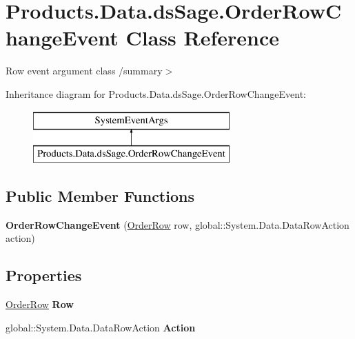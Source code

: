 \hypertarget{class_products_1_1_data_1_1ds_sage_1_1_order_row_change_event}{}\section{Products.\+Data.\+ds\+Sage.\+Order\+Row\+Change\+Event Class Reference}
\label{class_products_1_1_data_1_1ds_sage_1_1_order_row_change_event}


Row event argument class /summary$>$  


Inheritance diagram for Products.\+Data.\+ds\+Sage.\+Order\+Row\+Change\+Event\+:\begin{figure}[H]
\begin{center}
\leavevmode
\includegraphics[height=2.000000cm]{class_products_1_1_data_1_1ds_sage_1_1_order_row_change_event}
\end{center}
\end{figure}
\subsection*{Public Member Functions}
\begin{DoxyCompactItemize}
\item 
{\bfseries Order\+Row\+Change\+Event} (\hyperlink{class_products_1_1_data_1_1ds_sage_1_1_order_row}{Order\+Row} row, global\+::\+System.\+Data.\+Data\+Row\+Action action)\hypertarget{class_products_1_1_data_1_1ds_sage_1_1_order_row_change_event_a5dd450f5cfc2798dd2b8ca51857d6c02}{}\label{class_products_1_1_data_1_1ds_sage_1_1_order_row_change_event_a5dd450f5cfc2798dd2b8ca51857d6c02}

\end{DoxyCompactItemize}
\subsection*{Properties}
\begin{DoxyCompactItemize}
\item 
\hyperlink{class_products_1_1_data_1_1ds_sage_1_1_order_row}{Order\+Row} {\bfseries Row}\hypertarget{class_products_1_1_data_1_1ds_sage_1_1_order_row_change_event_a877b684ca12db20dbcd6baafca56ac55}{}\label{class_products_1_1_data_1_1ds_sage_1_1_order_row_change_event_a877b684ca12db20dbcd6baafca56ac55}

\item 
global\+::\+System.\+Data.\+Data\+Row\+Action {\bfseries Action}\hypertarget{class_products_1_1_data_1_1ds_sage_1_1_order_row_change_event_ac6c0dcdded233ceb936edf6d815010ac}{}\label{class_products_1_1_data_1_1ds_sage_1_1_order_row_change_event_ac6c0dcdded233ceb936edf6d815010ac}

\end{DoxyCompactItemize}


